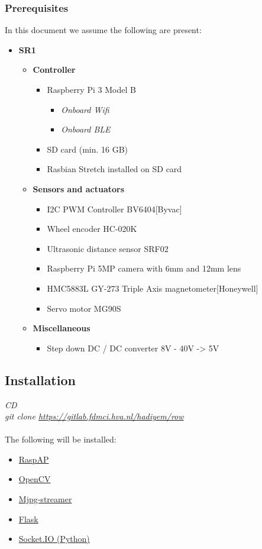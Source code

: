 \documentclass[12pt]{article}
\begin{document}
 	\subsubsection{Prerequisites}
 	In this document we assume the following are present:\\
 	\begin{itemize}
 		\item \textbf{SR1}
	 	\begin{itemize}
	 		\item \textbf{Controller}
	 		\begin{itemize}
	 			\item Raspberry Pi 3 Model B
	 			\begin{itemize}
	 				\item \emph{Onboard Wifi}
	 				\item \emph{Onboard BLE}
	 			\end{itemize}
	 			\item SD card (min. 16 GB)
	 			\item Rasbian Stretch installed on SD card
	 		\end{itemize}
	 		\item \textbf{Sensors and actuators}
	 		\begin{itemize}
	 			\item I2C PWM Controller BV6404[Byvac]
	 			\item Wheel encoder HC-020K
	 			\item Ultrasonic distance sensor SRF02
	 			\item Raspberry Pi 5MP camera with 6mm and 12mm lens
	 			\item HMC5883L GY-273 Triple Axis magnetometer[Honeywell]
	 			\item Servo motor MG90S
	 		\end{itemize}
	 		\item \textbf{Miscellaneous}
	 		\begin{itemize}
	 			\item Step down DC / DC converter 8V - 40V -> 5V
	 		\end{itemize}
	 	\end{itemize}
 	\end{itemize}
 	\subsection{Installation}
 	\emph{CD}\\
 	\emph{git clone \url{https://gitlab.fdmci.hva.nl/hadiyem/row}}\\
 	\\The following will be installed:
 	\begin{itemize}
 		\item \href{https://github.com/billz/raspap-webgui}{RaspAP}
 		\item \href{https://opencv.org/}{OpenCV}
 		\item \href{https://github.com/jacksonliam/mjpg-streamer}{Mjpg-streamer}
 		\item \href{http://flask.pocoo.org/}{Flask}
 		\item \href{https://github.com/miguelgrinberg/python-socketio}{Socket.IO (Python)}
 	\end{itemize}
\end{document}
